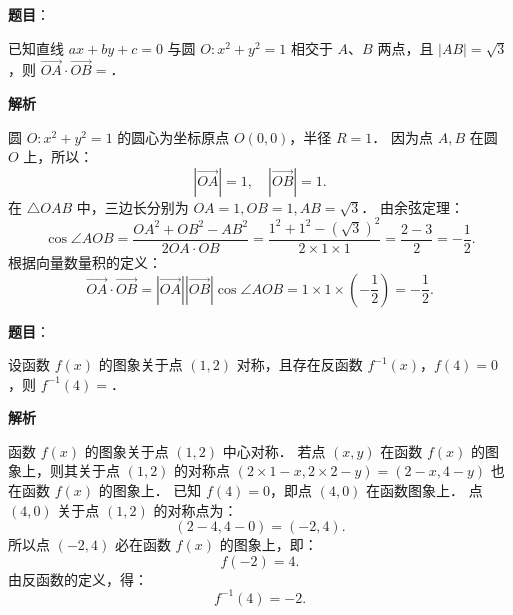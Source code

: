 \begin{answer}

\textbf{题目}：

已知直线 $ax + by + c = 0$ 与圆 $O: x^2 + y^2 = 1$ 相交于 $A$、$B$ 两点，且 $|AB| = \sqrt{3}$，则 $\vec{OA} \cdot \vec{OB} =$\gkblank{}．

\textbf{解析}

圆 $O: x^2 + y^2 = 1$ 的圆心为坐标原点 $O(0, 0)$，半径 $R = 1$．
因为点 $A, B$ 在圆 $O$ 上，所以：
\nopagebreak[4]
\[
|\vec{OA}| = 1, \quad |\vec{OB}| = 1.
\]
在 $\triangle OAB$ 中，三边长分别为 $OA = 1, OB = 1, AB = \sqrt{3}$．
由余弦定理：
\nopagebreak[4]
\[
\cos \angle AOB = \frac{OA^2 + OB^2 - AB^2}{2 OA \cdot OB} = \frac{1^2 + 1^2 - (\sqrt{3})^2}{2 \times 1 \times 1} = \frac{2 - 3}{2} = -\frac{1}{2}.
\]
根据向量数量积的定义：
\nopagebreak[4]
\[
\vec{OA} \cdot \vec{OB} = |\vec{OA}| |\vec{OB}| \cos \angle AOB = 1 \times 1 \times \left(-\frac{1}{2}\right) = -\frac{1}{2}.
\]


\end{answer}
\begin{answer}

\textbf{题目}：

设函数 $f(x)$ 的图象关于点 $(1, 2)$ 对称，且存在反函数 $f^{-1}(x)$，$f(4) = 0$，则 $f^{-1}(4) =$\gkblank{}．

\textbf{解析}

函数 $f(x)$ 的图象关于点 $(1, 2)$ 中心对称．
若点 $(x, y)$ 在函数 $f(x)$ 的图象上，则其关于点 $(1, 2)$ 的对称点 $(2 \times 1 - x, 2 \times 2 - y) = (2 - x, 4 - y)$ 也在函数 $f(x)$ 的图象上．
已知 $f(4) = 0$，即点 $(4, 0)$ 在函数图象上．
点 $(4, 0)$ 关于点 $(1, 2)$ 的对称点为：
\nopagebreak[4]
\[
(2 - 4, 4 - 0) = (-2, 4).
\]
所以点 $(-2, 4)$ 必在函数 $f(x)$ 的图象上，即：
\nopagebreak[4]
\[
f(-2) = 4.
\]
由反函数的定义，得：
\nopagebreak[4]
\[
f^{-1}(4) = -2.
\]


\end{answer}
